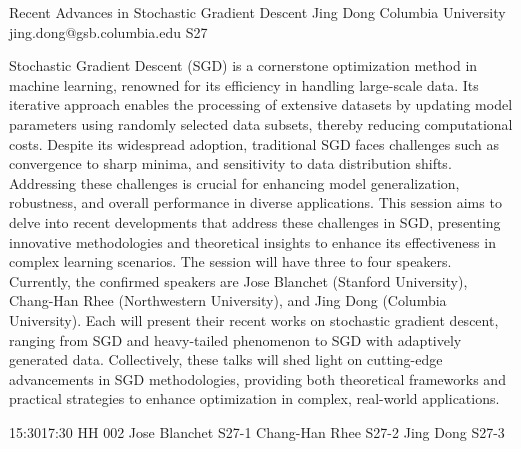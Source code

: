 \documentclass[12pt,lettersize,oneside]{book} %
\begin{document}
\clearpage

\begin{session}
 {Recent Advances in Stochastic Gradient Descent}%
 {Jing Dong}%
 {Columbia University}%
 {jing.dong@gsb.columbia.edu}%
{}{}{}
 {S27}%
{}

 Stochastic Gradient Descent (SGD) is a cornerstone optimization method in machine learning,
 renowned for its efficiency in handling large-scale data. Its iterative approach enables
 the processing of extensive datasets by updating model parameters using randomly selected
 data subsets, thereby reducing computational costs. Despite its widespread adoption, traditional
 SGD faces challenges such as convergence to sharp minima, and sensitivity to data
 distribution shifts. Addressing these challenges is crucial for enhancing model generalization,
 robustness, and overall performance in diverse applications. This session aims to delve into
 recent developments that address these challenges in SGD, presenting innovative methodologies
 and theoretical insights to enhance its effectiveness in complex learning scenarios.
 The session will have three to four speakers. Currently, the confirmed speakers are Jose
 Blanchet (Stanford University), Chang-Han Rhee (Northwestern University), and Jing Dong
 (Columbia University). Each will present their recent works on stochastic gradient descent,
 ranging from SGD and heavy-tailed phenomenon to SGD with adaptively generated data.
 Collectively, these talks will shed light on cutting-edge advancements in SGD methodologies,
 providing both theoretical frameworks and practical strategies to enhance optimization in
 complex, real-world applications.
\end{session}



\sessionPart{}%
{\hfill{}
{15:30}{17:30} %
{HH 002}} %
{Jose Blanchet}
{S27-1}
{Chang-Han Rhee}
{S27-2}
{Jing Dong}
{S27-3}
\end{document}
